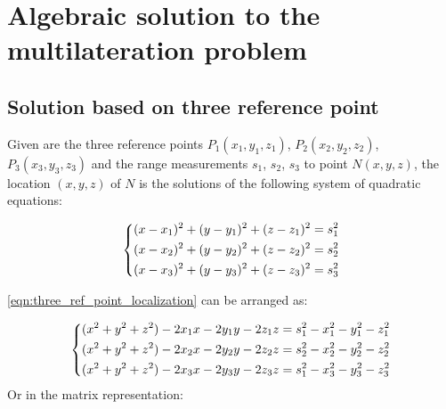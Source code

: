 \documentclass[./main.tex]{subfiles}
\begin{document}
\chapter{Algebraic solution to the multilateration problem}

\section{Solution based on three reference point}
Given are the three reference points $P_1(x_1, y_1, z_1)$, $P_2(x_2, y_2, z_2)$, $P_3(x_3, y_3, z_3)$ and the range measurements $s_1$, $s_2$, $s_3$ to point $N(x,y,z)$, the location $(x,y,z)$ of $N$ is the solutions of the following system of quadratic equations:

\begin{equation}
    \begin{dcases*}
        (x-x_1)^2 + (y-y_1)^2 + (z-z_1)^2 = s_1^2 \\
        (x-x_2)^2 + (y-y_2)^2 + (z-z_2)^2 = s_2^2 \\
        (x-x_3)^2 + (y-y_3)^2 + (z-z_3)^2 = s_3^2 
    \end{dcases*}
    \label{eqn:three_ref_point_localization}
\end{equation}

\ref{eqn:three_ref_point_localization} can be arranged as:

\begin{equation}
    \begin{dcases*}
        (x^2 + y^2 + z^2) -2x_1x - 2y_1y - 2z_1z = s_1^2 - x_1^2 - y_1^2 - z_1^2 \\
        (x^2 + y^2 + z^2) -2x_2x - 2y_2y - 2z_2z = s_2^2 - x_2^2 - y_2^2 - z_2^2 \\
        (x^2 + y^2 + z^2) -2x_3x - 2y_3y - 2z_3z = s_1^2 - x_3^2 - y_3^2 - z_3^2
    \end{dcases*}
    \label{eqn:three_ref_point_localization}
\end{equation}
Or in the matrix representation:
\end{document}
